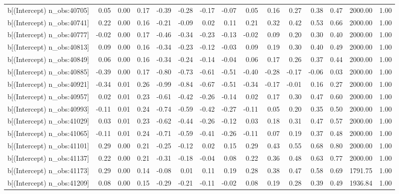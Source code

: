 \begin{table}[ht]
\begin{tabular}{rrrrrrrrrrrrrrr}
  b[(Intercept) n\_obs:40705] & 0.05 & 0.00 & 0.17 & -0.39 & -0.28 & -0.17 & -0.07 & 0.05 & 0.16 & 0.27 & 0.38 & 0.47 & 2000.00 & 1.00 \\ 
  b[(Intercept) n\_obs:40741] & 0.22 & 0.00 & 0.16 & -0.21 & -0.09 & 0.02 & 0.11 & 0.21 & 0.32 & 0.42 & 0.53 & 0.66 & 2000.00 & 1.00 \\ 
  b[(Intercept) n\_obs:40777] & -0.02 & 0.00 & 0.17 & -0.46 & -0.34 & -0.23 & -0.13 & -0.02 & 0.09 & 0.20 & 0.30 & 0.40 & 2000.00 & 1.00 \\ 
  b[(Intercept) n\_obs:40813] & 0.09 & 0.00 & 0.16 & -0.34 & -0.23 & -0.12 & -0.03 & 0.09 & 0.19 & 0.30 & 0.40 & 0.49 & 2000.00 & 1.00 \\ 
  b[(Intercept) n\_obs:40849] & 0.06 & 0.00 & 0.16 & -0.34 & -0.24 & -0.14 & -0.04 & 0.06 & 0.17 & 0.26 & 0.37 & 0.44 & 2000.00 & 1.00 \\ 
  b[(Intercept) n\_obs:40885] & -0.39 & 0.00 & 0.17 & -0.80 & -0.73 & -0.61 & -0.51 & -0.40 & -0.28 & -0.17 & -0.06 & 0.03 & 2000.00 & 1.00 \\ 
  b[(Intercept) n\_obs:40921] & -0.34 & 0.01 & 0.26 & -0.99 & -0.84 & -0.67 & -0.51 & -0.34 & -0.17 & -0.01 & 0.16 & 0.27 & 2000.00 & 1.00 \\ 
  b[(Intercept) n\_obs:40957] & 0.02 & 0.01 & 0.23 & -0.61 & -0.42 & -0.26 & -0.14 & 0.02 & 0.17 & 0.30 & 0.47 & 0.60 & 2000.00 & 1.00 \\ 
  b[(Intercept) n\_obs:40993] & -0.11 & 0.01 & 0.24 & -0.74 & -0.59 & -0.42 & -0.27 & -0.11 & 0.05 & 0.20 & 0.35 & 0.50 & 2000.00 & 1.00 \\ 
  b[(Intercept) n\_obs:41029] & 0.03 & 0.01 & 0.23 & -0.62 & -0.44 & -0.26 & -0.12 & 0.03 & 0.18 & 0.31 & 0.47 & 0.57 & 2000.00 & 1.00 \\ 
  b[(Intercept) n\_obs:41065] & -0.11 & 0.01 & 0.24 & -0.71 & -0.59 & -0.41 & -0.26 & -0.11 & 0.07 & 0.19 & 0.37 & 0.48 & 2000.00 & 1.00 \\ 
  b[(Intercept) n\_obs:41101] & 0.29 & 0.00 & 0.21 & -0.25 & -0.12 & 0.02 & 0.15 & 0.29 & 0.43 & 0.55 & 0.68 & 0.80 & 2000.00 & 1.00 \\ 
  b[(Intercept) n\_obs:41137] & 0.22 & 0.00 & 0.21 & -0.31 & -0.18 & -0.04 & 0.08 & 0.22 & 0.36 & 0.48 & 0.63 & 0.77 & 2000.00 & 1.00 \\ 
  b[(Intercept) n\_obs:41173] & 0.29 & 0.00 & 0.14 & -0.08 & 0.01 & 0.11 & 0.19 & 0.28 & 0.38 & 0.47 & 0.58 & 0.69 & 1791.75 & 1.00 \\ 
  b[(Intercept) n\_obs:41209] & 0.08 & 0.00 & 0.15 & -0.29 & -0.21 & -0.11 & -0.02 & 0.08 & 0.19 & 0.28 & 0.39 & 0.49 & 1936.84 & 1.00 \\ 

\end{tabular}
\end{table}
